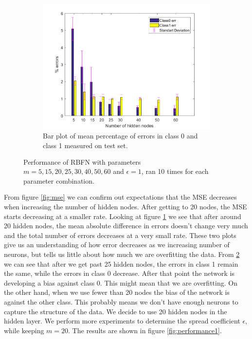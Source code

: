 \documentclass[a4paper, 11pt]{article}
\begin{document}
\begin{figure}[h!]
\begin{subfigure}[t]{0.32\textwidth}
        \label{fig:errorplot}
    \end{subfigure}
    \hfill %
    \begin{subfigure}[t]{0.32\textwidth}
        \includegraphics[width=\textwidth]{../figures/perf/errorbar_m(5-60)_e(10-10).png}
        \caption{Bar plot of mean percentage of errors in class 0 and class 1 measured on test set.}
        \label{fig:errorbar}
    \end{subfigure}
    \caption{Performance of RBFN with parameters $m = 5,15,20,25,30,40,50,60$ and $\epsilon = 1$, ran 10  times for each parameter combination.}\label{fig:performance}
\end{figure}


From figure \ref{fig:mse} we can confirm out expectations that the MSE decreases when increasing the number of hidden nodes. After getting to 20 nodes, the MSE starts decreasing at a smaller rate. Looking at figure \ref{fig:errorplot} we see that after around 20 hidden nodes, the mean absolute difference in errors doesn't change very much and the total number of errors decreases at a very small rate. These two plots give us an understanding of how error decreases as we increasing number of neurons, but tells us little about how much we are overfitting the data. From \ref{fig:errorbar} we can see that after we get past 25 hidden nodes, the errors in class 1 remain the same, while the errors in class 0 decrease. After that point the network is developing a bias against class 0. This might mean that we are overfitting. On the other hand, when we use fewer than 20 nodes the bias of the network is against the other class. This probably means we don't have enough neurons to capture the structure of the data. We decide to use 20 hidden nodes in the hidden layer. We perform more experiments to determine the spread coefficient $\epsilon$, while keeping $m = 20$. The results are shown in figure \ref{fig:performance1}.
\end{document}
